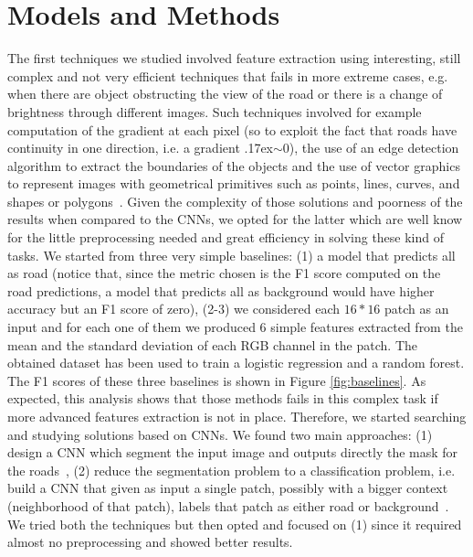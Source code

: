 \documentclass[10pt,conference,compsocconf]{IEEEtran}
\begin{document}
\section{Models and Methods}
\label{sec:models-methods}
The first techniques we studied involved feature extraction using interesting, still complex and not very efficient techniques that fails in more extreme cases, e.g. when there are object obstructing the view of the road or there is a change of brightness through different images. Such techniques involved for example computation of the gradient at each pixel (so to exploit the fact that roads have continuity in one direction, i.e. a gradient {\raise.17ex\hbox{$\scriptstyle\sim$}}0), the use of an edge detection algorithm to extract the boundaries of the objects and the use of vector graphics to represent images with geometrical primitives such as points, lines, curves, and shapes or polygons~\cite{HORMESE20161460}. Given the complexity of those solutions and poorness of the results when compared to the CNNs, we opted for the latter which are well know for the little preprocessing needed and great efficiency in solving these kind of tasks.
We started from three very simple baselines: (1) a model that predicts all as road (notice that, since the metric chosen is the F1 score computed on the road predictions, a model that predicts all as background would have higher accuracy but an F1 score of zero), (2-3) we considered each $16*16$ patch as an input and for each one of them we produced 6 simple features extracted from the mean and the standard deviation of each RGB channel in the patch. The obtained dataset has been used to train a logistic regression and a random forest. The F1 scores of these three baselines is shown in Figure \ref{fig:baselines}. As expected, this analysis shows that those methods fails in this complex task if more advanced features extraction is not in place.
Therefore, we started searching and studying solutions based on CNNs. We found two main approaches: (1) design a CNN which segment the input image and outputs directly the mask for the roads~\cite{lis2016}, (2) reduce the segmentation problem to a classification problem, i.e. build a CNN that given as input a single patch, possibly with a bigger context (neighborhood of that patch), labels that patch as either road or background~\cite{dario2016}. We tried both the techniques but then opted and focused on (1) since it required almost no preprocessing and showed better results. 
\end{document}
